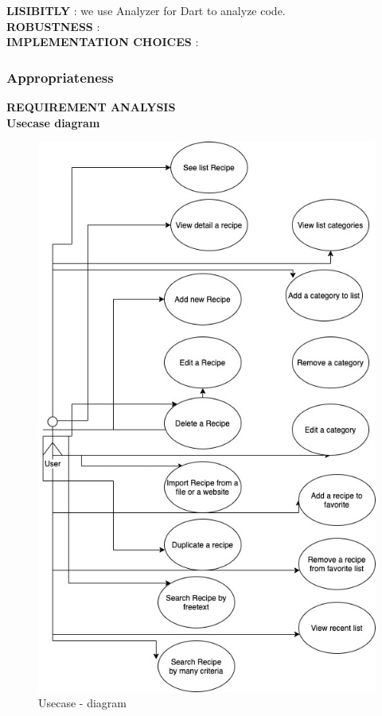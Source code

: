 \documentclass{article}
\begin{document}
 \textbf{LISIBITLY} : we use Analyzer for Dart to analyze code. \\
 \textbf{ROBUSTNESS}  :  \\
 \textbf{IMPLEMENTATION CHOICES} : \\  

\subsubsection{Appropriateness}
\textbf{REQUIREMENT ANALYSIS  }\\

\textbf{ Usecase diagram}

\begin{figure}[h!]
\centering
\includegraphics[scale=0.5]{Images/Usecase.jpg}
\caption{Usecase - diagram}
\label{fig:Usecase}
\end{figure}
\end{document}

